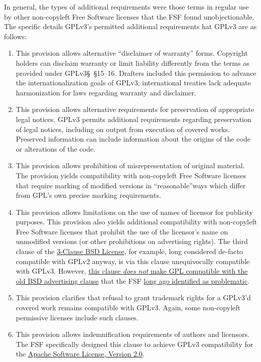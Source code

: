 In general, the types of additional requirements were those terms in regular
use by other non-copyleft Free Software licenses that the FSF found
unobjectionable.  The specific details GPLv3's permitted additional
requirements hat GPLv3 are as follows:

\begin{enumerate}[label=7(\alph*):,ref=GPLv3s7\alph*]

\item This provision allows alternative ``disclaimer of warranty''
  forms. Copyright holders can disclaim warranty or limit liability
  differently from the terms as provided under GPLv3\S~\S15--16.  Drafters
  included this permission to advance the internationalization goals of
  GPLv3; international treaties lack adequate harmonization for laws
  regarding warranty and disclaimer.

\item This provision allows alternative requirements for preservation of
  appropriate legal notices.  GPLv3 permits additional requirements regarding
  preservation of legal notices, including on output from execution of
  covered works.  Preserved information can include information about the
  origins of the code or alterations of the code.

\item This provision allows prohibition of misrepresentation of original
  material.  The provision yields compatibility with non-copyleft Free
  Software licenses that require marking of modified versions in
  ``reasonable''ways which differ from GPL's own precise marking
  requirements.

\item This provision allows limitations on the use of names of licensor for
  publicity purposes.  This provision also yields additional compatibility
  with non-copyleft Free Software licenses that prohibit the use of the
  licensor's name on unmodified versions (or other prohibitions on
  advertising rights).  The third clause of the
  \href{http://opensource.org/licenses/BSD-3-Clause}{3-Clause BSD
  License}, for example, long considered de-facto compatible with GPLv2
    anyway, is via this clause unequivocally compatible with GPLv3.  However,
    \href{https://www.gnu.org/licenses/license-list.html#OriginalBSD}{this
      clause \textit{does not} make GPL compatible with the old BSD
      advertising clause} that the FSF
    \href{https://www.gnu.org/philosophy/bsd.html}{long ago identified as
      problematic}.
 
\item This provision clarifies that refusal to grant trademark rights for a
  GPLv3'd covered work remains compatible with GPLv3.  Again, some
  non-copyleft permissive licenses include such clauses.

\item This provision allows indemnification requirements of authors and
  licensors.  The FSF specifically designed this clause to achieve GPLv3
  compatibility for the
  \href{http://www.apache.org/licenses/LICENSE-2.0.html}{Apache Software
    License, Version 2.0}.

\end{enumerate}

